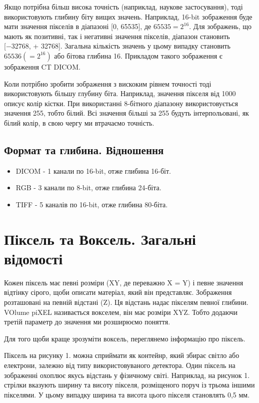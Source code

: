 \documentclass[a4paper,12pt]{article}
\begin{document}
    Якщо потрібна більш висока точність (наприклад, наукове застосування), тоді використовують глибину біту вищих значень.
    Наприклад, 16-bit зображення буде мати значення пікселів в діапазоні [0, 65535], де  \(65535 = 2^{16}\).
    Для зображень, що мають як позитивні, так і негативні значення пікселів, діапазон становить [−32768, + 32768].
    Загальна кількість значень у цьому випадку становить \(65536(=2^{16})\) або бітова глибина 16.
    Прикладом такого зображення є зображення CT DICOM.

    Коли потрібно зробити зображення з вискоким рівнем точності тоді використовують більшу глубину біта.
    Наприклад, значення пікселя від 1000 описує колір кістки.
    При використанні 8-бітного діапазону використовується значення 255, тобто білий.
    Всі значення більші за 255 будуть інтерпольовані, як білий колір, в свою чергу ми втрачаємо точність.

    \subsection{Формат та глибина. Відношення}\label{subsec:formats}
    \begin{itemize}
        \item DICOM - 1 канали по 16-bit, отже глибина 16-біт.
        \item RGB - 3 канали по 8-bit, отже глибина 24-біта.
        \item TIFF - 5 каналів по 16-bit, отже глибина 80-біта.
    \end{itemize}


    \section{Піксель та Воксель. Загальні відомості}\label{sec:pixel_voxel}
    Кожен піксель має певні розміри (XY, де переважно X = Y) і певне значення відтінку сірого, щоби описати матеріал, який він представляє.
    Зображення розташовані на певній відстані (Z).
    Ця відстань надає пікселям певної глибини.
    VOlume piXEL називається вокселем, він має розміри XYZ.
    Тобто додаючи третій параметр до значення ми розширюємо поняття.

    Для того щоби краще зрозуміти воксель, переглянемо інформацію про піксель.

    Піксель на рисунку 1. можна сприймати як контейнр, який збирає світло або електрони, залежно від типу використовуваного детектора.
    Один піксель на зображенні охоплює якусь відстань у фізичному світі.
    Наприклад, на рисунок 1. стрілки вказують ширину та висоту пікселя, розміщеного поруч із трьома іншими пікселями.
    У цьому випадку ширина та висота цього пікселя становлять 0,5 мм.
\end{document}
